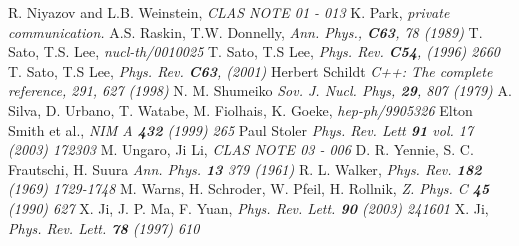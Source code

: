 \begin{singlespace}
\begin{thebibliography}{99}
      {R. Niyazov and L.B. Weinstein},                            \textit{CLAS NOTE 01 - 013}     
      {K. Park},                                                  \textit{private communication.}     
     {A.S. Raskin, T.W. Donnelly},                               \textit{Ann. Phys., {\bf C63}, 78 (1989)}   
      {T. Sato, T.S. Lee},                                        \textit{nucl-th/0010025}
      {T. Sato, T.S Lee},                                         \textit{Phys. Rev. {\bf C54}, (1996) 2660} 
      {T. Sato, T.S Lee},                                         \textit{Phys. Rev. {\bf C63}, (2001)}   
        {Herbert Schildt}                                           \textit{C++: The complete reference, 291, 627 (1998)} 
       {N. M. Shumeiko}                                            \textit{Sov. J. Nucl. Phys, {\bf 29}, 807 (1979)}
       {A. Silva, D. Urbano, T. Watabe, M. Fiolhais, K. Goeke},    \textit{hep-ph/9905326} 
        {Elton Smith et al.},                                       \textit{NIM A {\bf 432} (1999) 265}  
       {Paul Stoler}                                               \textit{Phys. Rev. Lett {\bf 91} vol. 17 (2003) 172303}
      {M. Ungaro, Ji Li},                                         \textit{CLAS NOTE 03 - 006} 
        {D. R. Yennie, S. C. Frautschi, H. Suura}                   \textit{Ann. Phys. {\bf 13} 379 (1961)}
     {R. L. Walker},                                             \textit{Phys. Rev. {\bf 182} (1969) 1729-1748}
     {M. Warns, H. Schroder, W. Pfeil, H. Rollnik},              \textit{Z. Phys. C {\bf 45} (1990) 627}
       {X. Ji, J. P. Ma, F. Yuan},                                 \textit{Phys. Rev. Lett. {\bf 90} (2003) 241601}  
       {X. Ji},                                                    \textit{Phys. Rev. Lett. {\bf 78} (1997) 610}   
\end{thebibliography}
\end{singlespace}
   
